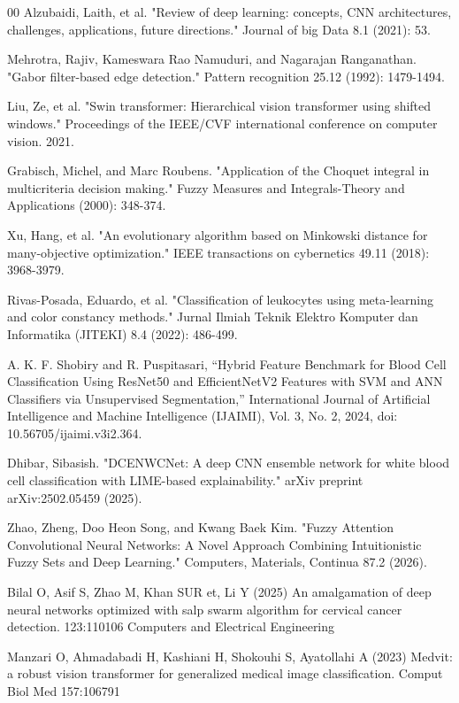 \documentclass[preprint,12pt]{elsarticle}
\begin{document}
\FloatBarrier
\begin{thebibliography}{00}
Alzubaidi, Laith, et al. "Review of deep learning: concepts, CNN architectures, challenges, applications, 
future directions." Journal of big Data 8.1 (2021): 53.

Mehrotra, Rajiv, Kameswara Rao Namuduri, and Nagarajan Ranganathan. "Gabor filter-based edge detection." Pattern recognition 25.12 (1992): 1479-1494.

Liu, Ze, et al. "Swin transformer: Hierarchical vision transformer using shifted windows." Proceedings of the IEEE/CVF international conference on computer vision. 2021.

Grabisch, Michel, and Marc Roubens. "Application of the Choquet integral in multicriteria decision making." Fuzzy Measures and Integrals-Theory and Applications (2000): 348-374.

Xu, Hang, et al. "An evolutionary algorithm based on Minkowski distance for many-objective optimization." IEEE transactions on cybernetics 49.11 (2018): 3968-3979.

Rivas-Posada, Eduardo, et al. "Classification of leukocytes using meta-learning and color constancy methods." Jurnal Ilmiah Teknik Elektro Komputer dan Informatika (JITEKI) 8.4 (2022): 486-499.

A. K. F. Shobiry and R. Puspitasari,
``Hybrid Feature Benchmark for Blood Cell Classification Using ResNet50 and EfficientNetV2 Features with SVM and ANN Classifiers via Unsupervised Segmentation,''
International Journal of Artificial Intelligence and Machine Intelligence (IJAIMI),
Vol. 3, No. 2, 2024, doi: 10.56705/ijaimi.v3i2.364.

Dhibar, Sibasish. "DCENWCNet: A deep CNN ensemble network for white blood cell classification with LIME-based explainability." arXiv preprint arXiv:2502.05459 (2025).

Zhao, Zheng, Doo Heon Song, and Kwang Baek Kim. "Fuzzy Attention Convolutional Neural Networks: A Novel Approach Combining Intuitionistic Fuzzy Sets and Deep Learning." Computers, Materials,  Continua 87.2 (2026).

Bilal O, Asif S, Zhao M, Khan SUR et, Li Y (2025) An amalgamation of deep neural networks optimized with salp swarm algorithm for cervical cancer detection. 123:110106 Computers and Electrical Engineering

Manzari O, Ahmadabadi H, Kashiani H, Shokouhi S, Ayatollahi A (2023) Medvit: a robust vision transformer for generalized medical image classification. Comput Biol Med 157:106791


\end{thebibliography}
\end{document}
